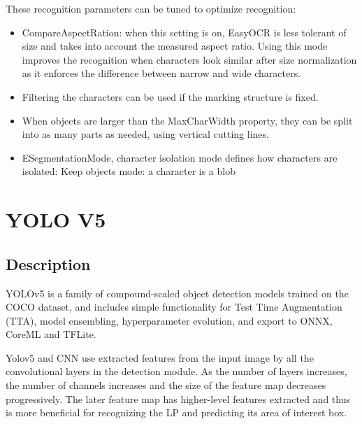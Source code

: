 These recognition parameters can be tuned to optimize recognition:
\begin{itemize}
	\item CompareAspectRation: when this setting is on, EasyOCR is less tolerant of size and takes into account the measured aspect ratio. Using this mode improves the recognition when characters look similar after size normalization as it enforces the difference between narrow and wide characters.
	\item Filtering the characters can be used if the marking structure is fixed.
	\item When objects are larger than the MaxCharWidth property, they can be split into as many parts as needed, using vertical cutting lines.
	\item ESegmentationMode, character isolation mode defines how characters are isolated:
	Keep objects mode: a character is a blob 
\end{itemize}


\section{YOLO V5}


\subsection{Description}
YOLOv5 is a family of compound-scaled object detection models trained on the COCO dataset, and includes simple functionality for Test Time Augmentation (TTA), model ensembling, hyperparameter evolution, and export to ONNX, CoreML and TFLite.

Yolov5 and CNN use extracted features from the input image by all the convolutional layers in the detection module. As the number of layers increases, the number of channels increases and the size of the feature map decreases progressively. \cite{Redmon:2016}
The later feature map has higher-level features extracted and thus is more beneficial for recognizing the LP and predicting its area of interest box.


